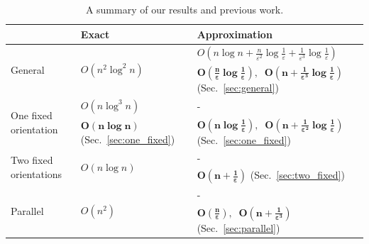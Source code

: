 \documentclass[10pt,a4paper]{article}
\theoremstyle{star}
\theoremstyle{claimstar}
\newcommand{\eps}{\ensuremath{\varepsilon}}
\begin{document}











\begin{table}[t]
\begin{tabular} {p{} m{} m{}} 
\toprule
~ & \textbf{Exact} & \textbf{Approximation}  \\ 
\midrule

\multirow{2}{*}{General} & \multirow{2}{*}{$O(n^2\log^2n) $~\cite{jaromczyk1995}} & $O(n\log n + \frac{n}{\eps^2} \log \frac{1}{\eps} + \frac{1}{\eps^3}\log \frac{1}{\eps})$~\cite{agarwalTwo, chan2006faster}\\
\cmidrule(lr){3-3} 
& & 
 $\boldsymbol{O(\frac{n}{\eps} \log \frac{1}{\eps}) } $$,\:$ $\boldsymbol{O(n + \frac{1}{\eps^3} \log \frac{1}{\eps}) }$ (Sec.~\ref{sec:general}) 
\\
\cmidrule(r){1-1} \cmidrule(l){2-3} 




\multirow{2}{*}{One fixed orientation} &  $O(n  \log^3 n)$~\cite{ahn2024constrained}  & - \\
\cmidrule(lr){2-2}  \cmidrule(lr){3-3} 
& $\boldsymbol{O(n \log n)}$ (Sec.~\ref{sec:one_fixed})
& $\boldsymbol{O(n \log \frac{1}{\eps})}$$,\:$ $\boldsymbol{O(n + \frac{1}{\eps^2} \log \frac{1}{\eps}) }$  (Sec.~\ref{sec:one_fixed})   \\
\cmidrule(r){1-1} \cmidrule(l){2-3} 

\multirow{2}{*}{Two fixed orientations} & \multirow{2}{*}{$O(n \log n)$~\cite{ahn2024constrained} } & - \\
\cmidrule(lr){3-3} 
& & 
$\boldsymbol{O(n + \frac{1}{\eps})}$  (Sec.~\ref{sec:two_fixed})  \\
\cmidrule(r){1-1} \cmidrule(l){2-3} 

\multirow{2}{*}{Parallel} & \multirow{2}{*}{$O(n^2)$~\cite{bae2020minimum}} & - \\
\cmidrule(lr){3-3} 
& & 
 $\boldsymbol{O(\frac{n}{\eps})}$$,\:$  $\boldsymbol{O(n + \frac{1}{\eps^3})}$ (Sec.~\ref{sec:parallel})  \\
\bottomrule
\end{tabular}
\caption{A summary of our results and previous work.}
\label{table:result}
\end{table}
\end{document}

